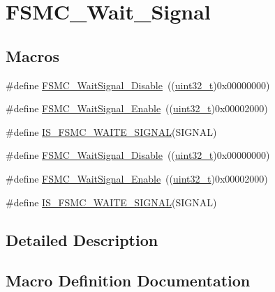 \hypertarget{group___f_s_m_c___wait___signal}{}\section{F\+S\+M\+C\+\_\+\+Wait\+\_\+\+Signal}
\label{group___f_s_m_c___wait___signal}
\subsection*{Macros}
\begin{DoxyCompactItemize}
\item 
\#define \hyperlink{group___f_s_m_c___wait___signal_ga6ea66c8ddee073281c421533bdff7e19}{F\+S\+M\+C\+\_\+\+Wait\+Signal\+\_\+\+Disable}~((\hyperlink{_p_e___types_8h_a33594304e786b158f3fb30289278f5af}{uint32\+\_\+t})0x00000000)
\item 
\#define \hyperlink{group___f_s_m_c___wait___signal_gaf809e339f1cdc9d0a815fd98712e9ee3}{F\+S\+M\+C\+\_\+\+Wait\+Signal\+\_\+\+Enable}~((\hyperlink{_p_e___types_8h_a33594304e786b158f3fb30289278f5af}{uint32\+\_\+t})0x00002000)
\item 
\#define \hyperlink{group___f_s_m_c___wait___signal_gae617db4f15c82850d4f5c927f9a7db3e}{I\+S\+\_\+\+F\+S\+M\+C\+\_\+\+W\+A\+I\+T\+E\+\_\+\+S\+I\+G\+N\+AL}(S\+I\+G\+N\+AL)
\item 
\#define \hyperlink{group___f_s_m_c___wait___signal_ga6ea66c8ddee073281c421533bdff7e19}{F\+S\+M\+C\+\_\+\+Wait\+Signal\+\_\+\+Disable}~((\hyperlink{_p_e___types_8h_a33594304e786b158f3fb30289278f5af}{uint32\+\_\+t})0x00000000)
\item 
\#define \hyperlink{group___f_s_m_c___wait___signal_gaf809e339f1cdc9d0a815fd98712e9ee3}{F\+S\+M\+C\+\_\+\+Wait\+Signal\+\_\+\+Enable}~((\hyperlink{_p_e___types_8h_a33594304e786b158f3fb30289278f5af}{uint32\+\_\+t})0x00002000)
\item 
\#define \hyperlink{group___f_s_m_c___wait___signal_gae617db4f15c82850d4f5c927f9a7db3e}{I\+S\+\_\+\+F\+S\+M\+C\+\_\+\+W\+A\+I\+T\+E\+\_\+\+S\+I\+G\+N\+AL}(S\+I\+G\+N\+AL)
\end{DoxyCompactItemize}


\subsection{Detailed Description}


\subsection{Macro Definition Documentation}
